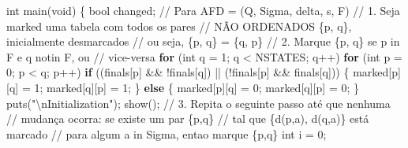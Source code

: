 \documentclass[
  brazilian,
  letterpaper,
]{book}
\newenvironment{Shaded}{\begin{snugshade}}{\end{snugshade}}
\newcommand{\CommentTok}[1]{\textcolor[rgb]{0.37,0.37,0.37}{#1}}
\newcommand{\ControlFlowTok}[1]{\textcolor[rgb]{0.00,0.23,0.31}{\textbf{#1}}}
\newcommand{\DataTypeTok}[1]{\textcolor[rgb]{0.68,0.00,0.00}{#1}}
\newcommand{\DecValTok}[1]{\textcolor[rgb]{0.68,0.00,0.00}{#1}}
\newcommand{\NormalTok}[1]{\textcolor[rgb]{0.00,0.23,0.31}{#1}}
\newcommand{\OperatorTok}[1]{\textcolor[rgb]{0.37,0.37,0.37}{#1}}
\newcommand{\SpecialCharTok}[1]{\textcolor[rgb]{0.37,0.37,0.37}{#1}}
\newcommand{\StringTok}[1]{\textcolor[rgb]{0.13,0.47,0.30}{#1}}
\theoremstyle{plain}
\theoremstyle{definition}
\theoremstyle{remark}
\begin{document}
\begin{Shaded}
\begin{Highlighting}[]
\DataTypeTok{int}\NormalTok{ main}\OperatorTok{(}\DataTypeTok{void}\OperatorTok{)}
\OperatorTok{\{}
    \DataTypeTok{bool}\NormalTok{ changed}\OperatorTok{;}
    \CommentTok{// Para AFD = (Q, Sigma, delta, s, F)}
    \CommentTok{// 1. Seja marked uma tabela com todos os pares}
    \CommentTok{//    NÃO ORDENADOS \{p, q\}, inicialmente desmarcados}
    \CommentTok{//    ou seja, \{p, q\} = \{q, p\}}
    \CommentTok{// 2. Marque \{p, q\} se p in F e q notin F, ou}
    \CommentTok{//    vice{-}versa}
    \ControlFlowTok{for} \OperatorTok{(}\DataTypeTok{int}\NormalTok{ q }\OperatorTok{=} \DecValTok{1}\OperatorTok{;}\NormalTok{ q }\OperatorTok{\textless{}}\NormalTok{ NSTATES}\OperatorTok{;}\NormalTok{ q}\OperatorTok{++)}
        \ControlFlowTok{for} \OperatorTok{(}\DataTypeTok{int}\NormalTok{ p }\OperatorTok{=} \DecValTok{0}\OperatorTok{;}\NormalTok{ p }\OperatorTok{\textless{}}\NormalTok{ q}\OperatorTok{;}\NormalTok{ p}\OperatorTok{++)}
            \ControlFlowTok{if} \OperatorTok{((}\NormalTok{finals}\OperatorTok{[}\NormalTok{p}\OperatorTok{]} \OperatorTok{\&\&} \OperatorTok{!}\NormalTok{finals}\OperatorTok{[}\NormalTok{q}\OperatorTok{])} \OperatorTok{||}
                \OperatorTok{(!}\NormalTok{finals}\OperatorTok{[}\NormalTok{p}\OperatorTok{]} \OperatorTok{\&\&}\NormalTok{ finals}\OperatorTok{[}\NormalTok{q}\OperatorTok{]))}
            \OperatorTok{\{}
\NormalTok{                marked}\OperatorTok{[}\NormalTok{p}\OperatorTok{][}\NormalTok{q}\OperatorTok{]} \OperatorTok{=} \DecValTok{1}\OperatorTok{;}
\NormalTok{                marked}\OperatorTok{[}\NormalTok{q}\OperatorTok{][}\NormalTok{p}\OperatorTok{]} \OperatorTok{=} \DecValTok{1}\OperatorTok{;}
            \OperatorTok{\}}
            \ControlFlowTok{else}
            \OperatorTok{\{}
\NormalTok{                marked}\OperatorTok{[}\NormalTok{p}\OperatorTok{][}\NormalTok{q}\OperatorTok{]} \OperatorTok{=} \DecValTok{0}\OperatorTok{;}
\NormalTok{                marked}\OperatorTok{[}\NormalTok{q}\OperatorTok{][}\NormalTok{p}\OperatorTok{]} \OperatorTok{=} \DecValTok{0}\OperatorTok{;}
            \OperatorTok{\}}
\NormalTok{    puts}\OperatorTok{(}\StringTok{"}\SpecialCharTok{\textbackslash{}n}\StringTok{Initialization"}\OperatorTok{);}
\NormalTok{    show}\OperatorTok{();}
    \CommentTok{// 3. Repita o seguinte passo até que nenhuma}
    \CommentTok{//    mudança ocorra: se existe um par \{p,q\}}
    \CommentTok{//    tal que \{d(p,a), d(q,a)\} está marcado}
    \CommentTok{//    para algum a in Sigma, entao marque \{p,q\}}
    \DataTypeTok{int}\NormalTok{ i }\OperatorTok{=} \DecValTok{0}\OperatorTok{;}

\end{Highlighting}
\end{Shaded}
\end{document}
